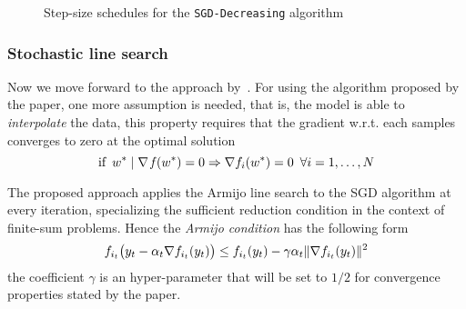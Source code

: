 \begin{figure}
\centering
{} \quad
{}
\caption{Step-size schedules for the \texttt{SGD-Decreasing} algorithm}
\label{fig:decre-step}
\end{figure}

\subsubsection{Stochastic line search}

Now we move forward to the approach by~\textcite{vaswani_painless_2019}. For using the algorithm proposed by the paper, one more assumption is needed, that is, the model is able to \emph{interpolate} the data, this property requires that the gradient w.r.t. each samples converges to zero at the optimal solution
\[
\text{if}\,\,\,w^\ast\mid\nabla\operatorname*{\mathit{f}}(w^\ast)=0\Rightarrow\nabla f_i(w^\ast)=0\,\,\,\forall i=1,\dots,N
\]

The proposed approach applies the Armijo line search to the SGD algorithm at every iteration, specializing the sufficient reduction condition in the context of finite-sum problems. Hence the \emph{Armijo condition} has the following form
\begin{equation}\label{eq:mini-armijo}
f_{i_t}\bigl(y_t-\alpha_t\nabla f_{i_t}(y_t)\bigr)\leq f_{i_t}(y_t)-\gamma\alpha_t\lVert\nabla f_{i_t}(y_t)\rVert^2
\end{equation}
the coefficient $\gamma$ is an hyper-parameter that will be set to $1/2$ for convergence properties stated by the paper.


